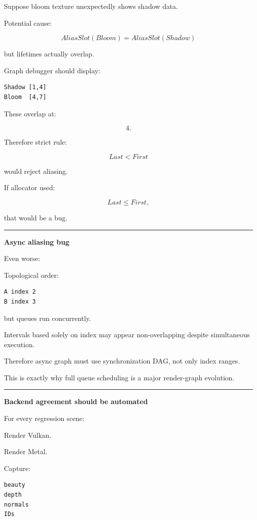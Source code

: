 Suppose bloom texture unexpectedly shows shadow data.

Potential cause:

\[
AliasSlot(Bloom)
=
AliasSlot(Shadow)
\]

but lifetimes actually overlap.

Graph debugger should display:

\begin{verbatim}
Shadow [1,4]
Bloom  [4,7]
\end{verbatim}

These overlap at:

\[
4.
\]

Therefore strict rule:

\[
Last<First
\]

would reject aliasing.

If allocator used:

\[
Last\le First,
\]

that would be a bug.

\begin{center}\rule{0.5\linewidth}{0.5pt}\end{center}

\textbf{Async aliasing bug}

Even worse:

Topological order:

\begin{verbatim}
A index 2
B index 3
\end{verbatim}

but queues run concurrently.

Intervals based solely on index may appear non-overlapping despite simultaneous execution.

Therefore async graph must use synchronization DAG, not only index ranges.

This is exactly why full queue scheduling is a major render-graph evolution.

\begin{center}\rule{0.5\linewidth}{0.5pt}\end{center}

\textbf{Backend agreement should be automated}

For every regression scene:

Render Vulkan.

Render Metal.

Capture:

\begin{verbatim}
beauty
depth
normals
IDs
\end{verbatim}


